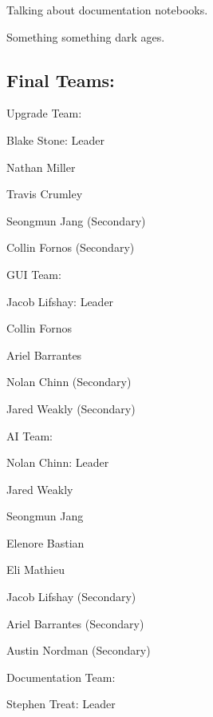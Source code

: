 \begin{DoxyEnumerate}
\item Talking about documentation notebooks.
\begin{DoxyItemize}
\item Something something dark ages.
\end{DoxyItemize}
\end{DoxyEnumerate}

\subsection*{Final Teams\+:}


\begin{DoxyEnumerate}
\item Upgrade Team\+:
\begin{DoxyItemize}
\item Blake Stone\+: Leader
\item Nathan Miller
\item Travis Crumley
\item Seongmun Jang (Secondary)
\item Collin Fornos (Secondary)
\end{DoxyItemize}
\item G\+U\+I Team\+:
\begin{DoxyItemize}
\item Jacob Lifshay\+: Leader
\item Collin Fornos
\item Ariel Barrantes
\item Nolan Chinn (Secondary)
\item Jared Weakly (Secondary)
\end{DoxyItemize}
\item A\+I Team\+:
\begin{DoxyItemize}
\item Nolan Chinn\+: Leader
\item Jared Weakly
\item Seongmun Jang
\item Elenore Bastian
\item Eli Mathieu
\item Jacob Lifshay (Secondary)
\item Ariel Barrantes (Secondary)
\item Austin Nordman (Secondary)
\end{DoxyItemize}
\item Documentation Team\+:
\begin{DoxyItemize}
\item Stephen Treat\+: Leader

\end{DoxyItemize}
\end{DoxyEnumerate}
